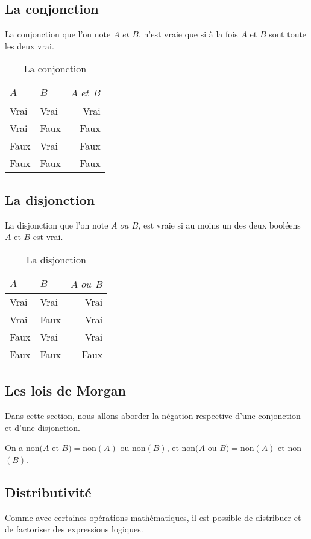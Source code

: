 \subsection{La conjonction}
La conjonction que l'on note $A$ $et$ $B$, n'est vraie que si à la fois $A$ et $B$ sont toute les deux vrai.
\begin{table}[h]
\centering
\begin{tabu} spread \linewidth {|l|l|r|}
\hline
$A$ & $B$ & $A$ $et$ $B$ \\ \hline
Vrai & Vrai & Vrai \\ \hline
Vrai & Faux & Faux \\ \hline
Faux & Vrai & Faux \\ \hline
Faux & Faux & Faux \\ \hline
\end{tabu}
\caption{La conjonction}
\end{table}
\subsection{La disjonction}
La disjonction que l'on note $A$ $ou$ $B$, est vraie si au moins un des deux booléens $A$ et $B$ est vrai.
\begin{table}[h]
\centering
\begin{tabu} spread \linewidth {|l|l|r|}
\hline
$A$ & $B$ & $A$ $ou$ $B$ \\ \hline
Vrai & Vrai & Vrai \\ \hline
Vrai & Faux & Vrai \\ \hline
Faux & Vrai & Vrai \\ \hline
Faux & Faux & Faux \\ \hline
\end{tabu}
\caption{La disjonction}
\end{table}
\subsection{Les lois de Morgan}
Dans cette section, nous allons aborder la négation respective d'une conjonction et d'une disjonction.

On a non$(A$ et $B) = $non$(A)$ ou non$(B)$,
et non$(A$ ou $B) = $non$(A)$ et non$(B)$.

\subsection{Distributivité}
Comme avec certaines opérations mathématiques, il est possible de distribuer et de factoriser des expressions logiques.


